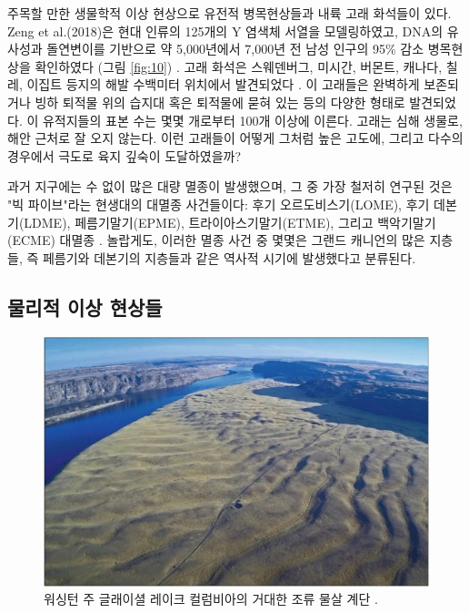 \documentclass[10pt,twocolumn,letterpaper]{article}
\begin{document}
주목할 만한 생물학적 이상 현상으로 유전적 병목현상들과 내륙 고래 화석들이 있다. Zeng et al.(2018)은 현대 인류의 125개의 Y 염색체 서열을 모델링하였고, DNA의 유사성과 돌연변이를 기반으로 약 5,000년에서 7,000년 전  남성 인구의 95\% 감소 병목현상을 확인하였다 (그림 \ref{fig:10}) \cite{62}. 고래 화석은 스웨덴버그, 미시간, 버몬트, 캐나다, 칠레, 이집트 등지의 해발 수백미터 위치에서 발견되었다 \cite{63,64,65,66}. 이 고래들은 완벽하게 보존되거나  빙하 퇴적물 위의 습지대 혹은  퇴적물에 묻혀 있는 등의 다양한 형태로 발견되었다. 이 유적지들의 표본 수는 몇몇 개로부터 100개 이상에 이른다. 고래는 심해 생물로, 해안 근처로 잘 오지 않는다. 이런 고래들이 어떻게 그처럼 높은 고도에, 그리고 다수의 경우에서 극도로 육지 깊숙이 도달하였을까?

과거 지구에는 수 없이 많은 대량 멸종이 발생했으며, 그 중 가장 철저히 연구된 것은 "빅 파이브"라는 현생대의 대멸종 사건들이다: 후기 오르도비스기(LOME), 후기 데본기(LDME), 페름기말기(EPME), 트라이아스기말기(ETME), 그리고 백악기말기(ECME) 대멸종 \cite{88,89}. 놀랍게도, 이러한 멸종 사건 중 몇몇은 그랜드 캐니언의 많은 지층들, 즉 페름기와 데본기의  지층들과 같은 역사적 시기에 발생했다고 분류된다.

\subsection{물리적 이상 현상들}

\begin{figure}[b]
\begin{center}
   \includegraphics[width=1\linewidth]{columbia.jpg}
\end{center}
   \caption{워싱턴 주 글래이셜 레이크 컬럼비아의 거대한 조류 물살 계단 \cite{80}.}
\label{fig:11}
\label{fig:onecol}
\end{figure}
\end{document}
